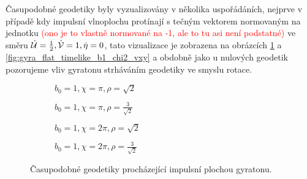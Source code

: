 Časupodobné geodetiky byly vyzualizovány v několika uspořádáních, nejprve v případě kdy impulsní
vlnoplochu protínají s tečným vektorem normovaným na jednotku \textcolor{red}{(ono je to vlastně normované na -1, ale to tu asi není podstatné)}
ve směru $\dot{\mathcal{U}}=\frac{1}{2}, \dot{\mathcal{V}} = 1, \dot{\eta}=0$, tato vizualizace je zobrazena na
obrázcích \ref{fig:gyra_flat_timelike_b1_chi1_2} a \ref{fig:gyra_flat_timelike_b1_chi2_vxy} a obdobně jako u
nulových geodetik pozorujeme vliv gyratonu strháváním geodetiky ve smyslu rotace.

\begin{figure}
    \centering
    \begin{subfigure}[b]{0.48\textwidth}
         \caption{$b_0=1, \chi=\pi, \rho=\sqrt{2}$} 
    \end{subfigure}
    \begin{subfigure}[b]{0.48\textwidth}
         \caption{$b_0=1, \chi=\pi, \rho=\frac{3}{\sqrt{2}}$} 
    \end{subfigure}
    \hfill
    \begin{subfigure}[b]{0.48\textwidth}
         \caption{$b_0=1, \chi=2\pi, \rho=\sqrt{2}$} 
    \end{subfigure}
    \begin{subfigure}[b]{0.48\textwidth}
         \caption{$b_0=1, \chi=2\pi, \rho=\frac{3}{\sqrt{2}}$} 
    \end{subfigure}
    \caption{Časupodobné geodetiky procházející impulsní plochou gyratonu.}
    \label{fig:gyra_flat_timelike_b1_chi1_2}
\end{figure}

